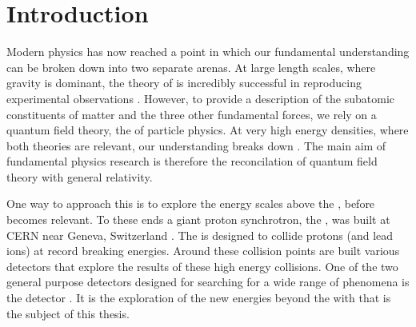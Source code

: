\chapter{Introduction}
\label{chap:introduction}





Modern physics has now reached a point in which our fundamental
understanding can be broken down into two separate arenas. At large
length scales, where gravity is dominant, the theory of \GR
\cite{1914ZMP63215E} is incredibly successful in reproducing
experimental observations \cite{Will:2014kxa}.  However, to provide a
description of the subatomic constituents of matter and the three
other fundamental forces, we rely on a quantum field theory, the \SM
of particle physics. At very high energy densities, where both
theories are relevant, our understanding breaks down
\cite{Weinberg:1980gg}. The main aim of fundamental physics research
is therefore the reconcilation of quantum field theory with general
relativity. 

One way to approach this is to explore the energy scales above the
\SM, before \GR becomes relevant. To these ends a giant proton
synchrotron, the \LHC, was built at CERN near Geneva, Switzerland
\cite{Evans:2008zzb}. The \LHC is designed to collide protons (and
lead ions) at record breaking energies. Around these collision points
are built various detectors that explore the results of these high
energy collisions. One of the two general purpose detectors designed
for searching for a wide range of phenomena is the \CMS detector
\cite{Chatrchyan:2008aa}. It is the exploration of the new energies
beyond the \SM with \CMS that is the subject of this thesis.

